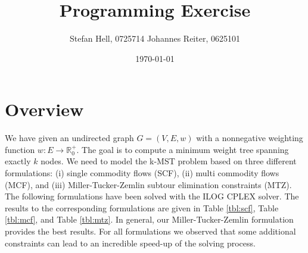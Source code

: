 \documentclass [11pt]{article}
\title{Programming Exercise}
\author{Stefan Hell, 0725714 \quad Johannes Reiter, 0625101}
\date{\today}
\begin{document}
 
\maketitle

\section{Overview}
We have given an undirected graph $G=(V,E,w)$ with a nonnegative weighting
function $ w : E \rightarrow \mathbb{R}_0^+$.
The goal is to compute a minimum weight tree spanning exactly $k$ nodes.
We need to model the k-MST problem based on three different formulations:
(i) single commodity flows (SCF), 
(ii) multi commodity flows (MCF), and
(iii) Miller-Tucker-Zemlin subtour elimination constraints (MTZ).
The following formulations have been solved with the ILOG CPLEX solver.
The results to the corresponding formulations are given in Table \ref{tbl:scf},
Table \ref{tbl:mcf}, and Table \ref{tbl:mtz}.
In general, our Miller-Tucker-Zemlin formulation provides the best results.
For all formulations we observed that some additional constraints can lead
to an incredible speed-up of the solving process.
\end{document}
